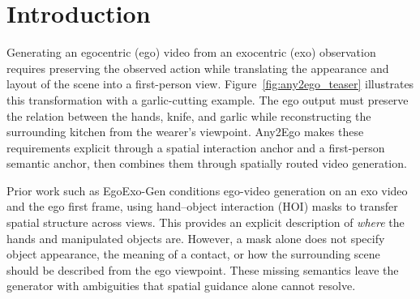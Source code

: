 \documentclass{article} %
\begin{document}
\begin{abstract}
base $\to$ global gate $\to$ spatial route is
$42.6\!\to\!37.8\!\to\!33.3$, against $121.6$--$177.0$ for image-to-video
baselines and $1118.7$/$2361.1$ for exo-conditioned video-to-video
baselines: our weakest arm is $2.9\times$ better than the strongest
baseline. The frame-level metrics, read against that control, agree wherever
they can resolve a difference -- SSIM $0.608\!\to\!0.636\!\to\!0.660$, PSNR
$21.1\!\to\!21.7\!\to\!22.3$, LPIPS $0.194\!\to\!0.163\!\to\!0.144$ --
monotonic and uninverted, with spatial routing best and the global gate
second on every metric. A component ablation confirms both anchors are
load-bearing rather than decorative: at inference, randomizing only the
caption's content (mask held real) costs $3\%$ PSNR / $4\%$ SSIM / $15\%$
LPIPS relative to the full model (which still wins on $88.7\%$ of clips),
while randomizing only the mask's spatial content (caption held real) costs
$27\%$ PSNR / $36\%$ SSIM / $2.5\times$ LPIPS (full wins $100\%$) -- the mask
supplies the dominant spatial skeleton, the caption a smaller but consistent
semantic refinement. We position spatial-routing text injection, together
with its trained captioner, as a validated instantiation of the textual
anchor.

\end{abstract}

\section{Introduction}
\label{sec:intro}

Generating an egocentric (ego) video from an exocentric (exo) observation
requires preserving the observed action while translating the appearance
and layout of the scene into a first-person view.
Figure~\ref{fig:any2ego_teaser} illustrates this transformation with a
garlic-cutting example. The ego output must preserve the relation between
the hands, knife, and garlic while reconstructing the surrounding kitchen
from the wearer's viewpoint. Any2Ego makes these requirements explicit
through a spatial interaction anchor and a first-person semantic anchor,
then combines them through spatially routed video generation.

Prior work such as EgoExo-Gen \citep{xu2025egoexogen} conditions ego-video
generation on an exo video and the ego first frame, using hand--object
interaction (HOI) masks to transfer spatial structure across views. This
provides an explicit description of \emph{where} the hands and manipulated
objects are. However, a mask alone does not specify object appearance,
the meaning of a contact, or how the surrounding scene should be described
from the ego viewpoint. These missing semantics leave the generator with
ambiguities that spatial guidance alone cannot resolve.
\end{document}

